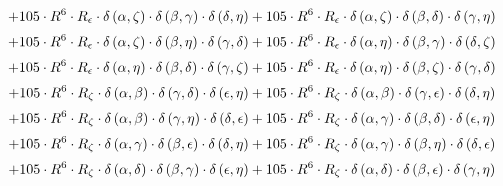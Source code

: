 \begin{subequations}
\begin{gather}
 \\[0.2em] \notag 		 + 105 \cdot R^{6} \cdot R_{\epsilon{}} \cdot \delta{}\left(\alpha{}, \zeta{}\right) \cdot \delta{}\left(\beta{}, \gamma{}\right) \cdot \delta{}\left(\delta{}, \eta{}\right)+ 105 \cdot R^{6} \cdot R_{\epsilon{}} \cdot \delta{}\left(\alpha{}, \zeta{}\right) \cdot \delta{}\left(\beta{}, \delta{}\right) \cdot \delta{}\left(\gamma{}, \eta{}\right) 
 \\[0.2em] \notag 		 + 105 \cdot R^{6} \cdot R_{\epsilon{}} \cdot \delta{}\left(\alpha{}, \zeta{}\right) \cdot \delta{}\left(\beta{}, \eta{}\right) \cdot \delta{}\left(\gamma{}, \delta{}\right)+ 105 \cdot R^{6} \cdot R_{\epsilon{}} \cdot \delta{}\left(\alpha{}, \eta{}\right) \cdot \delta{}\left(\beta{}, \gamma{}\right) \cdot \delta{}\left(\delta{}, \zeta{}\right) 
 \\[0.2em] \notag 		 + 105 \cdot R^{6} \cdot R_{\epsilon{}} \cdot \delta{}\left(\alpha{}, \eta{}\right) \cdot \delta{}\left(\beta{}, \delta{}\right) \cdot \delta{}\left(\gamma{}, \zeta{}\right)+ 105 \cdot R^{6} \cdot R_{\epsilon{}} \cdot \delta{}\left(\alpha{}, \eta{}\right) \cdot \delta{}\left(\beta{}, \zeta{}\right) \cdot \delta{}\left(\gamma{}, \delta{}\right) 
 \\[0.2em] \notag 		 + 105 \cdot R^{6} \cdot R_{\zeta{}} \cdot \delta{}\left(\alpha{}, \beta{}\right) \cdot \delta{}\left(\gamma{}, \delta{}\right) \cdot \delta{}\left(\epsilon{}, \eta{}\right)+ 105 \cdot R^{6} \cdot R_{\zeta{}} \cdot \delta{}\left(\alpha{}, \beta{}\right) \cdot \delta{}\left(\gamma{}, \epsilon{}\right) \cdot \delta{}\left(\delta{}, \eta{}\right) 
 \\[0.2em] \notag 		 + 105 \cdot R^{6} \cdot R_{\zeta{}} \cdot \delta{}\left(\alpha{}, \beta{}\right) \cdot \delta{}\left(\gamma{}, \eta{}\right) \cdot \delta{}\left(\delta{}, \epsilon{}\right)+ 105 \cdot R^{6} \cdot R_{\zeta{}} \cdot \delta{}\left(\alpha{}, \gamma{}\right) \cdot \delta{}\left(\beta{}, \delta{}\right) \cdot \delta{}\left(\epsilon{}, \eta{}\right) 
 \\[0.2em] \notag 		 + 105 \cdot R^{6} \cdot R_{\zeta{}} \cdot \delta{}\left(\alpha{}, \gamma{}\right) \cdot \delta{}\left(\beta{}, \epsilon{}\right) \cdot \delta{}\left(\delta{}, \eta{}\right)+ 105 \cdot R^{6} \cdot R_{\zeta{}} \cdot \delta{}\left(\alpha{}, \gamma{}\right) \cdot \delta{}\left(\beta{}, \eta{}\right) \cdot \delta{}\left(\delta{}, \epsilon{}\right) 
 \\[0.2em] \notag 		 + 105 \cdot R^{6} \cdot R_{\zeta{}} \cdot \delta{}\left(\alpha{}, \delta{}\right) \cdot \delta{}\left(\beta{}, \gamma{}\right) \cdot \delta{}\left(\epsilon{}, \eta{}\right)+ 105 \cdot R^{6} \cdot R_{\zeta{}} \cdot \delta{}\left(\alpha{}, \delta{}\right) \cdot \delta{}\left(\beta{}, \epsilon{}\right) \cdot \delta{}\left(\gamma{}, \eta{}\right) 

\end{gather}
\end{subequations}
